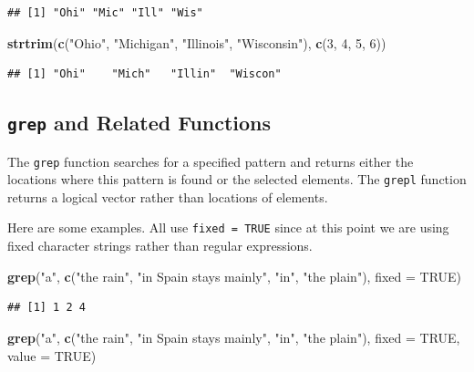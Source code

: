 \documentclass[
]{krantz}
\newenvironment{Shaded}{\begin{snugshade}}{\end{snugshade}}
\newcommand{\DataTypeTok}[1]{\textcolor[rgb]{0.13,0.29,0.53}{#1}}
\newcommand{\DecValTok}[1]{\textcolor[rgb]{0.00,0.00,0.81}{#1}}
\newcommand{\KeywordTok}[1]{\textcolor[rgb]{0.13,0.29,0.53}{\textbf{#1}}}
\newcommand{\NormalTok}[1]{#1}
\newcommand{\OtherTok}[1]{\textcolor[rgb]{0.56,0.35,0.01}{#1}}
\newcommand{\StringTok}[1]{\textcolor[rgb]{0.31,0.60,0.02}{#1}}
\begin{document}
\begin{verbatim}
## [1] "Ohi" "Mic" "Ill" "Wis"
\end{verbatim}

\begin{Shaded}
\begin{Highlighting}[]
\KeywordTok{strtrim}\NormalTok{(}\KeywordTok{c}\NormalTok{(}\StringTok{"Ohio"}\NormalTok{, }\StringTok{"Michigan"}\NormalTok{, }\StringTok{"Illinois"}\NormalTok{, }\StringTok{"Wisconsin"}\NormalTok{), }\KeywordTok{c}\NormalTok{(}\DecValTok{3}\NormalTok{, }\DecValTok{4}\NormalTok{, }\DecValTok{5}\NormalTok{, }\DecValTok{6}\NormalTok{))}
\end{Highlighting}
\end{Shaded}

\begin{verbatim}
## [1] "Ohi"    "Mich"   "Illin"  "Wiscon"
\end{verbatim}

\hypertarget{grep-and-related-functions}{%
\subsection{\texorpdfstring{\texttt{grep} and Related Functions}{grep and Related Functions}}\label{grep-and-related-functions}}

The \texttt{grep} function searches for a specified pattern and returns either the locations where this pattern is found or the selected elements. The \texttt{grepl} function returns a logical vector rather than locations of elements.

Here are some examples. All use \texttt{fixed\ =\ TRUE} since at this point we are using fixed character strings rather than regular expressions.

\begin{Shaded}
\begin{Highlighting}[]
\KeywordTok{grep}\NormalTok{(}\StringTok{"a"}\NormalTok{, }\KeywordTok{c}\NormalTok{(}\StringTok{"the rain"}\NormalTok{, }\StringTok{"in Spain    stays mainly"}\NormalTok{, }\StringTok{"in"}\NormalTok{, }\StringTok{"the plain"}\NormalTok{), }
     \DataTypeTok{fixed =} \OtherTok{TRUE}\NormalTok{)}
\end{Highlighting}
\end{Shaded}

\begin{verbatim}
## [1] 1 2 4
\end{verbatim}

\begin{Shaded}
\begin{Highlighting}[]
\KeywordTok{grep}\NormalTok{(}\StringTok{"a"}\NormalTok{, }\KeywordTok{c}\NormalTok{(}\StringTok{"the rain"}\NormalTok{, }\StringTok{"in Spain    stays mainly"}\NormalTok{, }\StringTok{"in"}\NormalTok{, }\StringTok{"the plain"}\NormalTok{), }
     \DataTypeTok{fixed =} \OtherTok{TRUE}\NormalTok{, }\DataTypeTok{value =} \OtherTok{TRUE}\NormalTok{)}
\end{Highlighting}
\end{Shaded}
\end{document}
